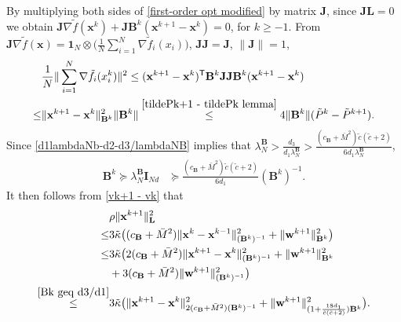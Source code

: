 \documentclass[12pt,draftcls,onecolumn]{IEEEtran}
\begin{document}
By multiplying both sides of \eqref{first-order opt modified} by matrix $\mathbf{J}$, since $\mathbf{J}\mathbf{L}=0$ we obtain $\mathbf{J}\nabla \tilde{f}(\mathbf{x}^{k}) + \mathbf{J}\mathbf{B}^k(\mathbf{x}^{k+1}-\mathbf{x}^{k})=0$, for $k \geq -1.$
From $\mathbf{J}\nabla \tilde{f}(\mathbf{x})=\mathbf{1}_N \otimes\big(\frac{1}{N} \sum_{i=1}^{N}\nabla\tilde{f}_i(x_i)\big)$, $\mathbf{J}\mathbf{J}=\mathbf{J}$, $\|\mathbf{J}\|=1$,
\begin{align}
	&\frac{1}{N}\|\sum_{i=1}^N \nabla \tilde{f}_i(x_i^k)\|^2 \leq (\mathbf{x}^{k+1}-\mathbf{x}^{k})^{\mathsf{T}}\mathbf{B}^k\mathbf{J}\mathbf{J}\mathbf{B}^k(\mathbf{x}^{k+1}-\mathbf{x}^{k}) \notag\\
	\leq & \|\mathbf{x}^{k+1}-\mathbf{x}^{k}\|^2_{\mathbf{B}^k}\|\mathbf{B}^k\| 
	\overset{\eqref{tildePk+1 - tildePk lemma}}{\leq} 4\|\mathbf{B}^k\|(\tilde{P}^k-\tilde{P}^{k+1}). \label{bounded gradient norm Bk}
\end{align}
Since \eqref{d1lambdaNb-d2-d3/lambdaNB} implies that $\lambda_N^{\mathbf{B}}> \frac{d_3}{d_1\lambda_N^{\mathbf{B}}}>\frac{(c_{\mathbf{B}}+\bar{M}^2)\tilde{c}(\tilde{c}+2)}{6d_1\lambda_N^{\mathbf{B}}}$, 
\begin{align}
	\mathbf{B}^k \succeq \lambda_N^{\mathbf{B}}\mathbf{I}_{Nd}&\succeq \frac{(c_{\mathbf{B}}+\bar{M}^2)\tilde{c}(\tilde{c}+2)}{6d_1}(\mathbf{B}^k)^{-1}. \label{Bk geq d3/d1}
\end{align}
It then follows from \eqref{vk+1 - vk} that
\begin{align}
	&\rho\|\mathbf{x}^{k+1}\|^2_\mathbf{L} \notag\\
	\leq& 3\tilde{\kappa}\big((c_{\mathbf{B}}+\bar{M}^2)\|\mathbf{x}^k-\mathbf{x}^{k-1}\|^2_{(\mathbf{B}^k)^{-1}}+\|\mathbf{w}^{k+1}\|^2_{\mathbf{B}^k}\big) \notag\\
	\leq& 3\tilde{\kappa}\big(2(c_{\mathbf{B}}+\bar{M}^2)\|\mathbf{x}^{k+1}-\mathbf{x}^k\|^2_{(\mathbf{B}^k)^{-1}}+\|\mathbf{w}^{k+1}\|^2_{\mathbf{B}^k}\notag\\
	&+ 3(c_{\mathbf{B}}+\bar{M}^2)\|\mathbf{w}^{k+1}\|^2_{(\mathbf{B}^k)^{-1}}\big)\notag\\
	\overset{\eqref{Bk geq d3/d1}}{\leq} & 3\tilde{\kappa}\big(\|\mathbf{x}^{k+1}-\mathbf{x}^k\|^2_{2(c_{\mathbf{B}}+\bar{M}^2)(\mathbf{B}^k)^{-1}}+ \|\mathbf{w}^{k+1}\|^2_{(1+\frac{18d_1}{\tilde{c}(\tilde{c}+2)})\mathbf{B}^k}\big). \notag
\end{align}
\end{document}
